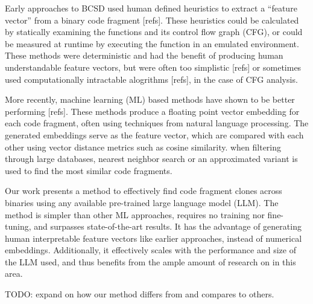 Early approaches to BCSD used human defined heuristics to extract a ``feature vector'' from a binary code fragment [refs]. These heuristics
could be calculated by statically examining the functions and its control flow graph (CFG), or could be measured at runtime
by executing the function in an emulated environment. These methods were deterministic and had the benefit of producing
human understandable feature vectors, but were often too simplistic [refs] or sometimes used computationally intractable alogrithms [refs], in
the case of CFG analysis.

More recently, machine learning (ML) based methods have shown to be better performing [refs].
These methods produce a floating point vector embedding for each code fragment, often using techniques from
natural language processing. The generated embeddings serve as the feature vector, which are compared
with each other using vector distance metrics such as cosine similarity. when filtering through large databases,
nearest neighbor search or an approximated variant is used to find the most similar code fragments.

Our work presents a method to effectively find code fragment clones across binaries using any available pre-trained
large language model (LLM). The method is simpler than other ML approaches, requires no training nor fine-tuning, and
surpasses state-of-the-art results. It has the advantage of generating human interpretable feature vectors like earlier approaches,
instead of numerical embeddings. Additionally, it effectively scales with the performance and size of the LLM used, and thus
benefits from the ample amount of research on in this area.

TODO: expand on how our method differs from and compares to others.


